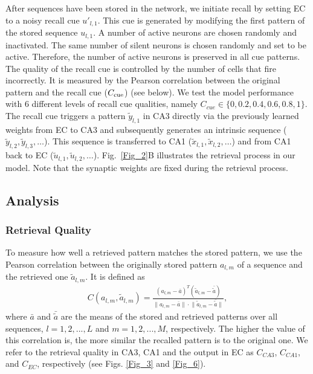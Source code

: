 \documentclass[utf8]{frontiersSCNS} %
\begin{document}
After sequences have been stored in the network, we initiate recall by setting EC to a noisy recall cue $u'_{l, 1}$. This cue is generated by modifying the first pattern of the stored sequence $u_{l, 1}$. A number of active neurons are chosen randomly and inactivated. The same number of silent neurons is chosen randomly and set to be active. 
%
Therefore, the number of active neurons is preserved in all cue patterns. 
%
The quality of the recall cue is controlled by the number of cells that fire incorrectly. It is measured by the Pearson correlation between the original pattern and the recall cue ($C_{\rm cue}$) (see below). We test the model performance with $6$ different levels of recall cue qualities, namely $ C_{cue} \in \{ 0, 0.2, 0.4, 0.6, 0.8, 1 \}$.
%
The recall cue triggers a pattern $\tilde{y}_{l, 1}$ in CA3 directly via the previously learned weights from EC to CA3 and subsequently generates an intrinsic sequence ($\tilde{y}_{l, 2}, \tilde{y}_{l, 3}, \ldots$). This sequence is transferred to CA1 ($\tilde{x}_{l, 1}, \tilde{x}_{l, 2}, \ldots$) and from CA1 back to EC ($\tilde{u}_{l, 1}, \tilde{u}_{l, 2}, \ldots$). Fig.~\ref{Fig_2}B illustrates the retrieval process in our model. Note that the synaptic weights are fixed during the retrieval process. 

\subsection{Analysis}
\subsubsection{Retrieval Quality}
To measure how well a retrieved pattern matches the stored pattern, we use the Pearson correlation between the originally stored pattern $a_{l, m}$ of a sequence and the retrieved one $\tilde{a}_{l, m}$. It is defined as
\begin{align*}
	C(a_{l, m},\tilde{a}_{l, m})  = \frac{(a_{l, m} -\bar{a})^T(\tilde{a}_{l, m} -\bar{\tilde{a}})}
{\lVert{a_{l, m} -\bar{a}} \rVert \cdot \lVert{\tilde{a}_{l, m} -\bar{\tilde{a}}}\rVert },
\end{align*}     
where $\bar{a}$ and $\bar{\tilde{a}}$ are the means of the stored and retrieved patterns over all sequences, $l = 1,2, ..., L$ and $m = 1,2, ..., M$, respectively. The higher the value of this correlation is, the more similar the recalled pattern is to the original one. We refer to the retrieval quality in CA3, CA1 and the output in EC as $C_{CA3}$, $C_{CA1}$, and $C_{EC}$, respectively (see Figs. \ref{Fig_3} and \ref{Fig_6}).
\end{document}
